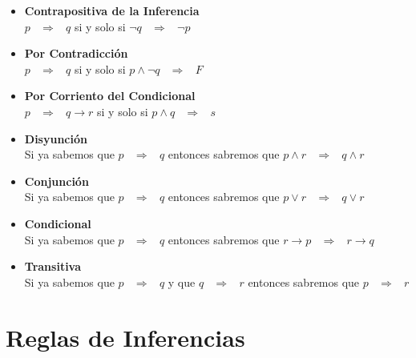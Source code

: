 \documentclass[12pt, fleqn]{report}                             %
\DeclareMathOperator \Space     {\quad}                         %
\DeclareMathOperator \MiniSpace {\;}                            %
\theoremstyle{break}                                            %
\newcommand \lInfire {\MiniSpace \Rightarrow \MiniSpace}        %
\begin{document}
                \begin{itemize}
                    \item
                        \textbf{Contrapositiva de la Inferencia}\\
                        $p \lInfire q$ si y solo si $\lnot q \lInfire \lnot p$

                    \item
                        \textbf{Por Contradicción}\\
                        $p \lInfire q$ si y solo si $p \land \lnot q \lInfire F$

                    \item
                        \textbf{Por Corriento del Condicional}\\
                        $p \lInfire q \to r$ si y solo si $p \land q \lInfire s$


                    \item
                        \textbf{Disyunción}\\
                        Si ya sabemos que $p \lInfire q$ entonces sabremos que $p \land r \lInfire q \land r$

                    \item
                        \textbf{Conjunción}\\
                        Si ya sabemos que $p \lInfire q$ entonces sabremos que $p \lor r \lInfire q \lor r$

                    \item
                        \textbf{Condicional}\\
                        Si ya sabemos que $p \lInfire q$ entonces sabremos que $r \to p \lInfire r \to q$

                    \item
                        \textbf{Transitiva}\\
                        Si ya sabemos que $p \lInfire q$ y que $q \lInfire r$ entonces sabremos que $p \lInfire r$
                \end{itemize}        

               



        \clearpage
        \section{Reglas de Inferencias}
\end{document}

